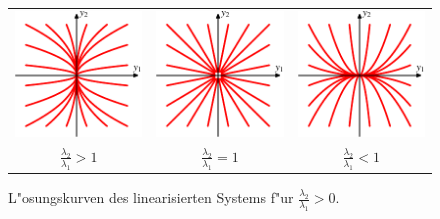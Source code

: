 \begin{figure}
\centering
\begin{tabular}{ccc}
\includegraphics{chapters/images/geometrie-2.pdf}&%
\includegraphics{chapters/images/geometrie-3.pdf}&%
\includegraphics{chapters/images/geometrie-4.pdf}\\
$\displaystyle \frac{\lambda_2}{\lambda_1}>1$&%
$\displaystyle \frac{\lambda_2}{\lambda_1}=1$&%
$\displaystyle \frac{\lambda_2}{\lambda_1}<1$
\end{tabular}
\caption{L"osungskurven des linearisierten Systems f"ur
$\frac{\lambda_2}{\lambda_1}>0$.
\label{geometrie:posportraits}}
\end{figure}

